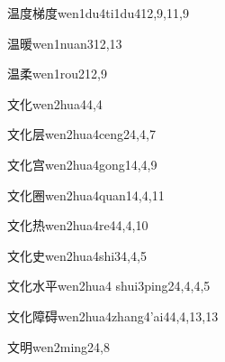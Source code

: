 \begin{verbete}{温度梯度}{wen1du4ti1du4}{12,9,11,9}
\end{verbete}

\begin{verbete}{温暖}{wen1nuan3}{12,13}
\end{verbete}

\begin{verbete}{温柔}{wen1rou2}{12,9}
\end{verbete}

\begin{verbete}{文化}{wen2hua4}{4,4}
\end{verbete}

\begin{verbete}{文化层}{wen2hua4ceng2}{4,4,7}
\end{verbete}

\begin{verbete}{文化宫}{wen2hua4gong1}{4,4,9}
\end{verbete}

\begin{verbete}{文化圈}{wen2hua4quan1}{4,4,11}
\end{verbete}

\begin{verbete}{文化热}{wen2hua4re4}{4,4,10}
\end{verbete}

\begin{verbete}{文化史}{wen2hua4shi3}{4,4,5}
\end{verbete}

\begin{verbete}{文化水平}{wen2hua4 shui3ping2}{4,4,4,5}
\end{verbete}

\begin{verbete}{文化障碍}{wen2hua4zhang4'ai4}{4,4,13,13}
\end{verbete}

\begin{verbete}{文明}{wen2ming2}{4,8}
\end{verbete}

